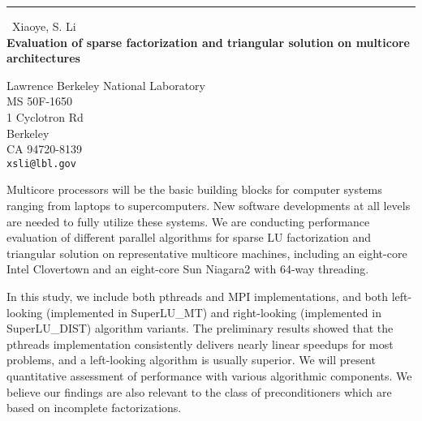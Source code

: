\documentclass{report}
\begin{document}
\begin{center}
\rule{6in}{1pt} \
{\large Xiaoye, S. Li \\
{\bf Evaluation of sparse factorization and triangular solution on multicore architectures}}

Lawrence Berkeley National Laboratory \\ MS 50F-1650 \\ 1 Cyclotron Rd \\ Berkeley \\ CA 94720-8139
\\
{\tt xsli@lbl.gov}\end{center}

Multicore processors will be the basic building blocks for
computer systems ranging from laptops to supercomputers.
New software developments at all levels are needed to fully
utilize these systems.
We are conducting performance evaluation of different parallel
algorithms for sparse LU factorization and triangular solution
on representative multicore machines, including an eight-core
Intel Clovertown and an eight-core Sun Niagara2 with
64-way threading.

In this study, we include both pthreads and MPI implementations,
and both left-looking (implemented in SuperLU\_MT) and
right-looking (implemented in SuperLU\_DIST) algorithm variants.
The preliminary results showed that the pthreads implementation
consistently delivers nearly linear speedups for most problems,
and a left-looking algorithm is usually superior.
We will present quantitative assessment of performance with
various algorithmic components. We believe our findings are
also relevant to the class of preconditioners which are based
on incomplete factorizations.
\end{document}
